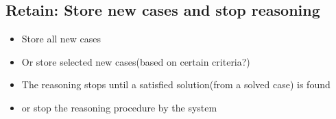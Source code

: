 \subsection{Retain: Store new cases and stop reasoning}
\begin{itemize}
\item Store all new cases
\item Or store selected new cases(based on certain criteria?)
\item The reasoning stops until a satisfied solution(from a solved case) is found
\item or stop the reasoning procedure by the system
\end{itemize}

